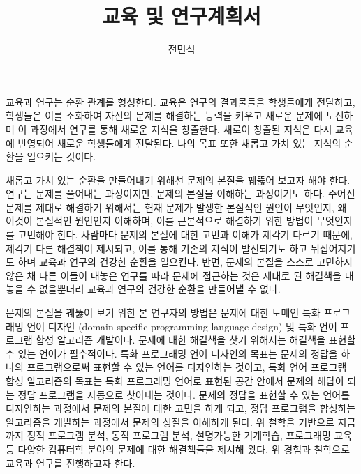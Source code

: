 \documentclass[11pt]{article}
\begin{document}
\title{교육 및 연구계획서}

\author{전민석}



\newcommand{\DisjunctiveModel}{\textsc{Disjunctive Model}}
\newcommand{\FeatureLanguage}{\textsc{Feature Language}}
\newcommand{\GDL}{\textsc{Graph Description Language}}
\newcommand{\PLXGL}{\textsc{PL4XGL}}


\newcommand{\AbstractRelativeWritePattern}{\textsc{Abstract Relative Write Pattern}}





\maketitle 
\begin{spacing}{1.145}

교육과 연구는 순환 관계를 형성한다. 
%
교육은 연구의 결과물들을 학생들에게 전달하고, 학생들은 이를 소화하여 자신의 문제를 해결하는 능력을 키우고 새로운 문제에 도전하며 이 과정에서 연구를 통해 새로운 지식을 창출한다. 새로이 창출된 지식은 다시 교육에 반영되어 새로운 학생들에게 전달된다.
%
나의 목표 또한 새롭고 가치 있는 지식의 순환을 일으키는 것이다.



새롭고 가치 있는 순환을 만들어내기 위해선 문제의 본질을 꿰뚫어 보고자 해야 한다.
%
연구는 문제를 풀어내는 과정이지만, 문제의 본질을 이해하는 과정이기도 하다. 
%
주어진 문제를 제대로 해결하기 위해서는 현재 문제가 발생한 본질적인 원인이 무엇인지, 왜 이것이 본질적인 원인인지 이해하며, 이를 근본적으로 해결하기 위한 방법이 무엇인지를 고민해야 한다.
%
사람마다 문제의 본질에 대한 고민과 이해가 제각기 다르기 때문에, 제각기 다른 해결책이 제시되고, 이를 통해 기존의 지식이 발전되기도 하고 뒤집어지기도 하며 교육과 연구의 건강한 순환을 일으킨다.
%
반면, 문제의 본질을 스스로 고민하지 않은 채 다른 이들이 내놓은 연구를 따라 문제에 접근하는 것은 제대로 된 해결책을 내놓을 수 없을뿐더러 교육과 연구의 건강한 순환을 만들어낼 수 없다.



문제의 본질을 꿰뚫어 보기 위한 본 연구자의 방법은 문제에 대한 도메인 특화 프로그래밍 언어 디자인 (domain-specific programming language design) 및 특화 언어 프로그램 합성 알고리즘 개발이다.
% 
문제에 대한 해결책을 찾기 위해서는 해결책을 표현할 수 있는 언어가 필수적이다.
% 
특화 프로그래밍 언어 디자인의 목표는 문제의 정답을 하나의 프로그램으로써 표현할 수 있는 언어를 디자인하는 것이고, 특화 언어 프로그램 합성 알고리즘의 목표는 특화 프로그래밍 언어로 표현된 공간 안에서 문제의 해답이 되는 정답 프로그램을 자동으로 찾아내는 것이다.
% 
문제의 정답을 표현할 수 있는 언어를 디자인하는 과정에서 문제의 본질에 대한 고민을 하게 되고, 정답 프로그램을 합성하는 알고리즘을 개발하는 과정에서 문제의 성질을 이해하게 된다.
%
위 철학을 기반으로 지금까지 정적 프로그램 분석, 동적 프로그램 분석, 설명가능한 기계학습, 프로그래밍 교육 등 다양한 컴퓨터학 분야의 문제에 대한 해결책들을 제시해 왔다.
%
위 경험과 철학으로 교육과 연구를 진행하고자 한다.
    







\end{spacing}
\end{document}
